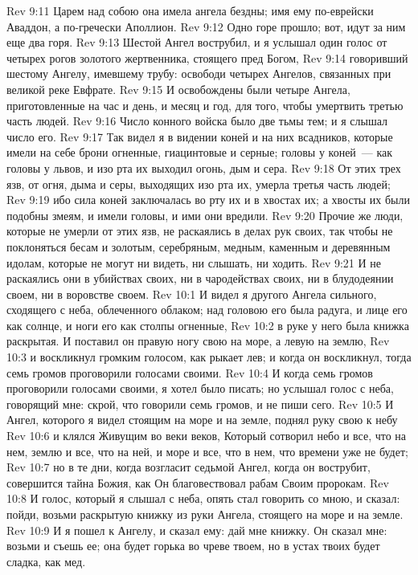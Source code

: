 \vs Rev 9:11 Царем над собою она имела ангела бездны; имя ему по-еврейски Аваддон, а по-гречески Аполлион.
\rsbpar\vs Rev 9:12 Одно горе прошло; вот, идут за ним еще два горя.
\rsbpar\vs Rev 9:13 Шестой Ангел вострубил, и я услышал один голос от четырех рогов золотого жертвенника, стоящего пред Богом,
\vs Rev 9:14 говоривший шестому Ангелу, имевшему трубу: освободи четырех Ангелов, связанных при великой реке Евфрате.
\vs Rev 9:15 И освобождены были четыре Ангела, приготовленные на час и день, и месяц и год, для того, чтобы умертвить третью часть людей.
\vs Rev 9:16 Число конного войска было две тьмы тем; и я слышал число его.
\vs Rev 9:17 Так видел я в видении коней и на них всадников, которые имели на себе брони огненные, гиацинтовые и серные; головы у коней~--- как головы у львов, и изо рта их выходил огонь, дым и сера.
\vs Rev 9:18 От этих трех язв, от огня, дыма и серы, выходящих изо рта их, умерла третья часть людей;
\vs Rev 9:19 ибо сила коней заключалась во рту их и в хвостах их; а хвосты их были подобны змеям, и имели головы, и ими они вредили.
\vs Rev 9:20 Прочие же люди, которые не умерли от этих язв, не раскаялись в делах рук своих, так чтобы не поклоняться бесам и золотым, серебряным, медным, каменным и деревянным идолам, которые не могут ни видеть, ни слышать, ни ходить.
\vs Rev 9:21 И не раскаялись они в убийствах своих, ни в чародействах своих, ни в блудодеянии своем, ни в воровстве своем.
\vs Rev 10:1 И видел я другого Ангела сильного, сходящего с неба, облеченного облаком; над головою его была радуга, и лице его как солнце, и ноги его как столпы огненные,
\vs Rev 10:2 в руке у него была книжка раскрытая. И поставил он правую ногу свою на море, а левую на землю,
\vs Rev 10:3 и воскликнул громким голосом, как рыкает лев; и когда он воскликнул, тогда семь громов проговорили голосами своими.
\vs Rev 10:4 И когда семь громов проговорили голосами своими, я хотел было писать; но услышал голос с неба, говорящий мне: скрой, что говорили семь громов, и не пиши сего.
\vs Rev 10:5 И Ангел, которого я видел стоящим на море и на земле, поднял руку свою к небу
\vs Rev 10:6 и клялся Живущим во веки веков, Который сотворил небо и все, что на нем, землю и все, что на ней, и море и все, что в нем, что времени уже не будет;
\vs Rev 10:7 но в те дни, когда возгласит седьмой Ангел, когда он вострубит, совершится тайна Божия, как Он благовествовал рабам Своим пророкам.
\vs Rev 10:8 И голос, который я слышал с неба, опять стал говорить со мною, и сказал: пойди, возьми раскрытую книжку из руки Ангела, стоящего на море и на земле.
\vs Rev 10:9 И я пошел к Ангелу, и сказал ему: дай мне книжку. Он сказал мне: возьми и съешь ее; она будет горька во чреве твоем, но в устах твоих будет сладка, как мед.
